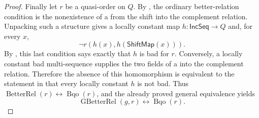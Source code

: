 \begin{proof}
Finally let $r$ be a quasi-order on $Q$.  By , the
ordinary better-relation condition is the nonexistence of a
 from the shift into the complement relation.
Unpacking such a structure gives a locally constant map
$h:\mathsf{IncSeq}\to Q$ and, for every $x$,
\[
 \neg r(h(x),h(\mathsf{ShiftMap}(x))).
\]
By , this last condition says exactly that $h$
is bad for $r$.  Conversely, a locally constant bad multi-sequence supplies
the two fields of a  into the complement
relation.  Therefore the absence of this homomorphism is equivalent to the
statement in  that every locally constant $h$ is not bad.
Thus $\operatorname{BetterRel}(r)\leftrightarrow\operatorname{Bqo}(r)$,
and the already proved general equivalence yields
\[
 \operatorname{GBetterRel}(g,r)\leftrightarrow\operatorname{Bqo}(r).
\]
\end{proof}
